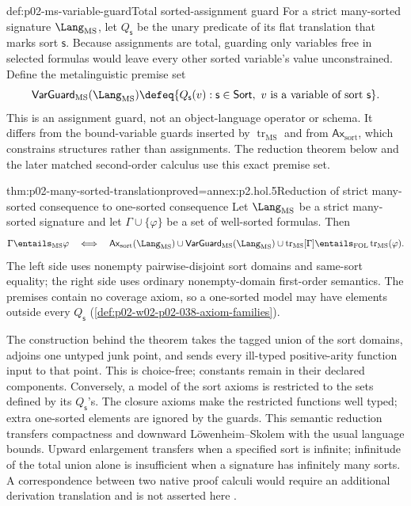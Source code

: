 \begin{hbdefinition}{def:p02-ms-variable-guard}{Total sorted-assignment guard}
For a strict many-sorted signature \(\Lang_{\mathrm{MS}}\), let
\(Q_{\mathsf s}\) be the unary predicate of its flat translation that marks
sort \(\mathsf s\).  Because assignments are total, guarding only variables
free in selected formulas would leave every other sorted variable's value
unconstrained.  Define the metalinguistic premise set
\[
 \mathsf{VarGuard}_{\mathrm{MS}}(\Lang_{\mathrm{MS}})
 \defeq\{Q_{\mathsf s}(v):\mathsf s\in\mathsf{Sort},
       \ v\text{ is a variable of sort }\mathsf s\}.
\]
This is an assignment guard, not an object-language operator or schema.  It
differs from the bound-variable guards inserted by
\(\operatorname{tr}_{\mathrm{MS}}\) and from
\(\mathsf{Ax}_{\mathrm{sort}}\), which constrains structures rather than
assignments.  The reduction theorem below and the later matched second-order
calculus use this exact premise set.
\end{hbdefinition}

\begin{hbtheorem}{thm:p02-many-sorted-translation}{proved=annex:p2.hol.5}{Reduction of strict many-sorted consequence to one-sorted consequence}
Let \(\Lang_{\mathrm{MS}}\) be a strict many-sorted signature and let
\(\Gamma\cup\{\varphi\}\) be a set of well-sorted formulas.  Then
\[
 \Gamma\entails_{\mathrm{MS}}\varphi
 \quad\Longleftrightarrow\quad
 \mathsf{Ax}_{\mathrm{sort}}(\Lang_{\mathrm{MS}})
   \cup\mathsf{VarGuard}_{\mathrm{MS}}(\Lang_{\mathrm{MS}})
   \cup\operatorname{tr}_{\mathrm{MS}}[\Gamma]
 \entails_{\mathrm{FOL}}
   \operatorname{tr}_{\mathrm{MS}}(\varphi).
\]
The left side uses nonempty pairwise-disjoint sort domains and same-sort
equality; the right side uses ordinary nonempty-domain first-order semantics.
The premises contain no coverage axiom, so a one-sorted model may have
elements outside every \(Q_{\mathsf s}\)
(\cref{def:p02-w02-p02-038-axiom-families}).
\end{hbtheorem}

The construction behind the theorem takes the tagged union of the sort
domains, adjoins one untyped junk point, and sends every ill-typed
positive-arity function input to that point.  This is choice-free; constants
remain in their declared components.  Conversely, a model of the sort axioms is restricted to the sets
defined by its \(Q_{\mathsf s}\)'s.  The closure axioms make the restricted functions
well typed; extra one-sorted elements are ignored by the guards.  This semantic
reduction transfers compactness and downward L\"owenheim--Skolem with the
usual language bounds.  Upward enlargement transfers when a specified sort
is infinite; infinitude of the total union alone is insufficient when a
signature has infinitely many sorts.  A correspondence between two native proof
calculi would require an additional derivation translation and is not asserted
here \cite{Manzano1996}.

